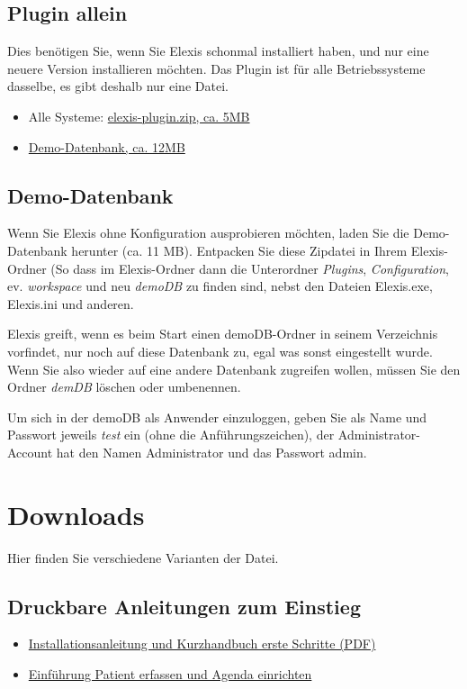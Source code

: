 \subsection{Plugin allein}
Dies benötigen Sie, wenn Sie Elexis schonmal installiert haben, und nur eine neuere Version installieren möchten. Das Plugin ist für alle Betriebssysteme dasselbe, es gibt deshalb nur eine Datei.
\begin{itemize}
 \item Alle Systeme:  \href{http://www.elexis.ch/download.php?file=elexis-plugin}{elexis-plugin.zip, ca. 5MB}
\item \href{http://www.elexis.ch/download.php?file=demodaten.zip}{Demo-Datenbank, ca. 12MB}
\end{itemize}

\subsection{Demo-Datenbank}
Wenn Sie Elexis ohne Konfiguration ausprobieren möchten, laden Sie die
Demo-Datenbank herunter (ca. 11 MB). Entpacken Sie diese Zipdatei in Ihrem Elexis-Ord\-ner
(So dass im Elexis-Ordner dann die Unterordner \textit{Plugins}, \textit{Con\-figu\-ra\-tion}, ev. \textit{work\-space}
und neu \textit{demoDB} zu finden sind, nebst den Dateien Elexis.exe, Elexis.ini und anderen.

Elexis greift, wenn es beim Start einen demoDB-Ordner in seinem Verzeichnis vorfindet, nur noch auf diese
 Datenbank zu, egal was sonst eingestellt wurde. Wenn Sie also wieder auf eine andere Datenbank zugreifen wollen,
 müssen Sie den Ordner \textit{demDB} löschen oder umbenennen.

Um sich in der demoDB als Anwender einzuloggen, geben Sie als Name und Passwort jeweils \textit{test} ein (ohne die Anführungszeichen), der Administrator-Account hat den Namen Administrator und das Passwort admin.
\section{Downloads}
Hier finden Sie verschiedene Varianten der Datei. %
\subsection{Druckbare  Anleitungen zum Einstieg}

\begin{itemize}
 \item \href{http://www.elexis.ch/files/erste_schritte.pdf}{Installationsanleitung und Kurzhandbuch erste Schritte (PDF)}
\item \href{http://www.elexis.ch/files/pat_agenda.pdf}{Einführung Patient erfassen und Agenda einrichten}
\end{itemize}

